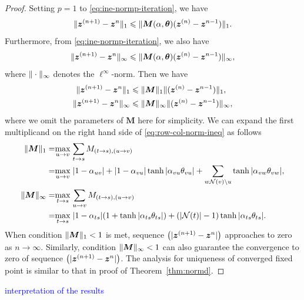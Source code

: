 \begin{proof}
  Setting $p=1$ to \eqref{eq:ine-normp-iteration}, we have
  \begin{equation}
    \| \bm{z}^{(n+1)} - \bm{z}^{n} \|_{1} \leqslant \| \bm{M}(\alpha, \bm{\theta})(\bm{z}^{(n)} - \bm{z}^{n-1}) \|_{1}.
  \end{equation}
  Furthermore, from \eqref{eq:ine-normp-iteration}, we also have
  \begin{equation}
    \| \bm{z}^{(n+1)} - \bm{z}^{n} \|_{\infty} \leqslant \| \bm{M}(\alpha, \bm{\theta})(\bm{z}^{(n)} - \bm{z}^{n-1}) \|_{\infty},
  \end{equation}
  where $\| \cdot \|_{\infty}$ denotes the $\ell^{\infty}$-norm.
  Then we have
  \begin{align}\label{eq:row-col-norm-ineq}
    \| \bm{z}^{(n+1)} - \bm{z}^{n} \|_{1} &\leqslant \| \bm{M} \|_{1}\| (\bm{z}^{(n)} - \bm{z}^{n-1}) \|_{1}, \nonumber \\
    \| \bm{z}^{(n+1)} - \bm{z}^{n} \|_{\infty} &\leqslant \| \bm{M} \|_{\infty}\| (\bm{z}^{(n)} - \bm{z}^{n-1}) \|_{\infty},
  \end{align}
  where we omit the parameters of $\bm{M}$ here for simplicity. We can expand the first multiplicand on the right hand side of \eqref{eq:row-col-norm-ineq} as follows
  \begin{align}
    \| \bm{M} \|_{1} =& \underset{u \rightarrow v}{\max}\;{\sum_{t\rightarrow s} M_{(t\rightarrow s), (u\rightarrow v)}} \nonumber \\
    =& \underset{u \rightarrow v}{\max}\;| 1-\alpha_{uv} | + | 1-\alpha_{vu} |\tanh{| \alpha_{vu} \theta_{vu} |} + \sum_{w \mathcal{N}(v) \backslash u} \tanh{| \alpha_{{vw}} \theta_{vw} |}, \nonumber \\
    \| \bm{M} \|_{\infty} =& \underset{t \rightarrow s}{\max}\;{\sum_{u\rightarrow v} M_{(t\rightarrow s), (u\rightarrow v)}} \nonumber \\
    =& \underset{t \rightarrow s}{\max}\; | 1-\alpha_{ts} | (1 + \tanh| \alpha_{ts} \theta_{ts} |) + (| \mathcal{N}(t) |-1)\tanh| \alpha_{ts} \theta_{ts} |.
  \end{align}
  When condition $\| \bm{M} \|_{1} < 1$ is met, sequence $\left( | \bm{z}^{(n+1)} - \bm{z}^{n} | \right)$ approaches to zero as $n\rightarrow \infty$. Similarly, condition $\| \bm{M} \|_{\infty}<1$ can also guarantee the convergence to zero of sequence $\left( | \bm{z}^{(n+1)} - \bm{z}^{n} | \right)$. The analysis for uniqueness of converged fixed point is similar to that in proof of Theorem~\ref{thm:normd}.
\end{proof}
\begin{remark}
  \textcolor{blue}{interpretation of the results}
\end{remark}

